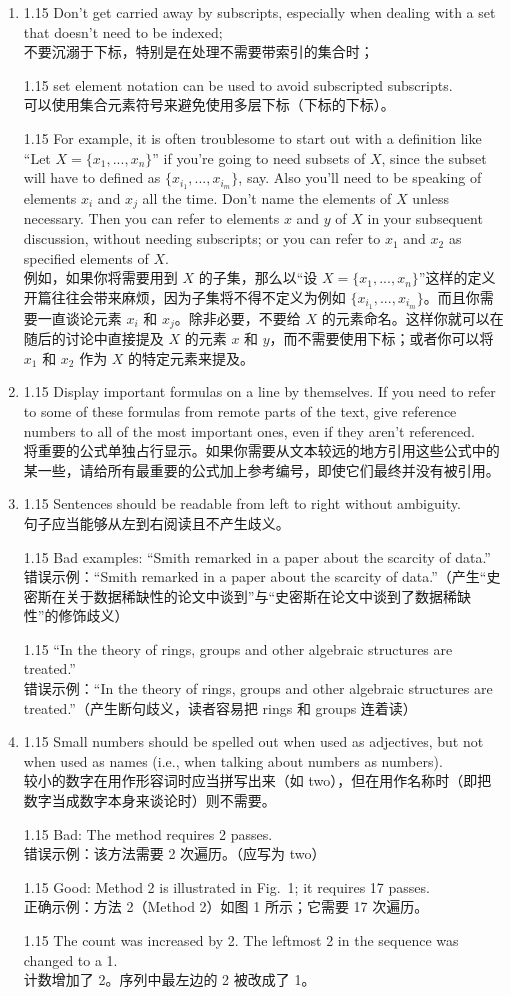 \documentclass[12pt,a4paper]{article}
\newcommand{\bilingual}[2]{
    \begin{spacing}{1.15} %
        \noindent \normalsize #1 \\[-0.5ex] %
        \small \textcolor{blue!70!black}{#2} %
    \end{spacing}
    \vspace{0.8em} %
}
\begin{document}
\begin{enumerate}
\item \bilingual{Don't get carried away by subscripts, especially when dealing with a set that doesn't need to be indexed;}{不要沉溺于下标，特别是在处理不需要带索引的集合时；} %
\bilingual{set element notation can be used to avoid subscripted subscripts.}{可以使用集合元素符号来避免使用多层下标（下标的下标）。} %
\bilingual{For example, it is often troublesome to start out with a definition like ``Let $X=\{x_{1},...,x_{n}\}$'' if you're going to need subsets of $X$, since the subset will have to defined as $\{x_{i_{1}},...,x_{i_{m}}\}$, say. Also you'll need to be speaking of elements $x_{i}$ and $x_{j}$ all the time. Don't name the elements of $X$ unless necessary. Then you can refer to elements $x$ and $y$ of $X$ in your subsequent discussion, without needing subscripts; or you can refer to $x_{1}$ and $x_{2}$ as specified elements of $X$.}{例如，如果你将需要用到 $X$ 的子集，那么以“设 $X=\{x_{1},...,x_{n}\}$”这样的定义开篇往往会带来麻烦，因为子集将不得不定义为例如 $\{x_{i_{1}},...,x_{i_{m}}\}$。而且你需要一直谈论元素 $x_{i}$ 和 $x_{j}$。除非必要，不要给 $X$ 的元素命名。这样你就可以在随后的讨论中直接提及 $X$ 的元素 $x$ 和 $y$，而不需要使用下标；或者你可以将 $x_{1}$ 和 $x_{2}$ 作为 $X$ 的特定元素来提及。} %

\item \bilingual{Display important formulas on a line by themselves. If you need to refer to some of these formulas from remote parts of the text, give reference numbers to all of the most important ones, even if they aren't referenced.}{将重要的公式单独占行显示。如果你需要从文本较远的地方引用这些公式中的某一些，请给所有最重要的公式加上参考编号，即使它们最终并没有被引用。} %

\item \bilingual{Sentences should be readable from left to right without ambiguity.}{句子应当能够从左到右阅读且不产生歧义。} %
\bilingual{Bad examples: ``Smith remarked in a paper about the scarcity of data.''}{错误示例：“Smith remarked in a paper about the scarcity of data.”（产生“史密斯在关于数据稀缺性的论文中谈到”与“史密斯在论文中谈到了数据稀缺性”的修饰歧义）} %
\bilingual{``In the theory of rings, groups and other algebraic structures are treated.''}{错误示例：“In the theory of rings, groups and other algebraic structures are treated.”（产生断句歧义，读者容易把 rings 和 groups 连着读）} %

\item \bilingual{Small numbers should be spelled out when used as adjectives, but not when used as names (i.e., when talking about numbers as numbers).}{较小的数字在用作形容词时应当拼写出来（如 two），但在用作名称时（即把数字当成数字本身来谈论时）则不需要。} %
\bilingual{Bad: The method requires 2 passes.}{错误示例：该方法需要 2 次遍历。（应写为 two）} %
\bilingual{Good: Method 2 is illustrated in Fig.\ 1; it requires 17 passes.}{正确示例：方法 2（Method 2）如图 1 所示；它需要 17 次遍历。} %
\bilingual{The count was increased by 2. The leftmost 2 in the sequence was changed to a 1.}{计数增加了 2。序列中最左边的 2 被改成了 1。} %


\end{enumerate}
\end{document}
